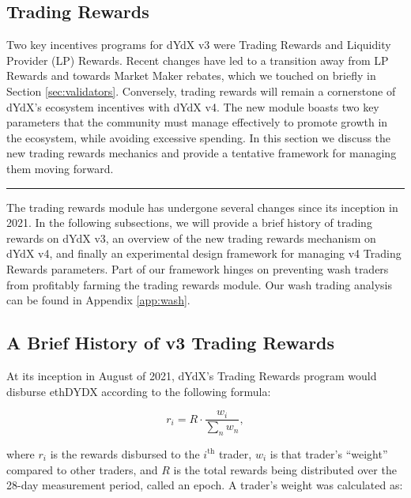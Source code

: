 \begin{fullwidth}
    \section{Trading Rewards} \label{sec:incentives}

    \begin{adjustwidth}{2cm}{2cm}
        \justify
        Two key incentives programs for dYdX v3 were Trading Rewards and Liquidity Provider (LP) Rewards. Recent changes have led to a transition away from LP Rewards and towards Market Maker rebates, which we touched on briefly in Section \ref{sec:validators}. Conversely, trading rewards will remain a cornerstone of dYdX's ecosystem incentives with dYdX v4. The new module boasts two key parameters that the community must manage effectively to promote growth in the ecosystem, while avoiding excessive spending. In this section we discuss the new trading rewards mechanics and provide a tentative framework for managing them moving forward.
    \end{adjustwidth}
    
    \textcolor{gray}{\rule{\linewidth}{0.1mm}}
\end{fullwidth}

    The trading rewards module has undergone several changes since its inception in 2021. In the following subsections, we will provide a brief history of trading rewards on dYdX v3, an overview of the new trading rewards mechanism on dYdX v4, and finally an experimental design framework for managing v4 Trading Rewards parameters. Part of our framework hinges on preventing wash traders from profitably farming the trading rewards module. Our wash trading analysis can be found in Appendix \ref{app:wash}.

    \subsection{A Brief History of v3 Trading Rewards}

        At its inception in August of 2021, dYdX's Trading Rewards program would disburse ethDYDX according to the following formula:

        \begin{equation}
            r_i = R \cdot \frac{w_i}{\sum_n{w_n}},
        \end{equation}

        where $r_i$ is the rewards disbursed to the $i^{\text{th}}$ trader, $w_i$ is that trader's ``weight'' compared to other traders, and $R$ is the total rewards being distributed over the 28-day measurement period, called an epoch. A trader's weight was calculated as:

